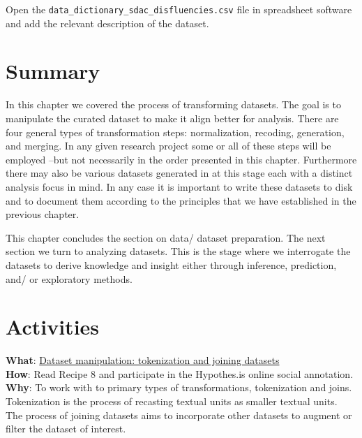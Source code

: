 \documentclass[
  letterpaper,
]{latex/krantz}
\begin{document}
Open the \texttt{data\_dictionary\_sdac\_disfluencies.csv} file in
spreadsheet software and add the relevant description of the dataset.

\hypertarget{summary-10}{%
\section*{Summary}\label{summary-10}}


In this chapter we covered the process of transforming datasets. The
goal is to manipulate the curated dataset to make it align better for
analysis. There are four general types of transformation steps:
normalization, recoding, generation, and merging. In any given research
project some or all of these steps will be employed --but not
necessarily in the order presented in this chapter. Furthermore there
may also be various datasets generated in at this stage each with a
distinct analysis focus in mind. In any case it is important to write
these datasets to disk and to document them according to the principles
that we have established in the previous chapter.

This chapter concludes the section on data/ dataset preparation. The
next section we turn to analyzing datasets. This is the stage where we
interrogate the datasets to derive knowledge and insight either through
inference, prediction, and/ or exploratory methods.

\hypertarget{activities-6}{%
\section*{Activities}\label{activities-6}}


\begin{tcolorbox}[enhanced jigsaw, toprule=.15mm, bottomtitle=1mm, coltitle=black, title=\textcolor{quarto-callout-tip-color}{\faLightbulb}\hspace{0.5em}{Recipe}, left=2mm, colframe=quarto-callout-tip-color-frame, bottomrule=.15mm, colbacktitle=quarto-callout-tip-color!10!white, leftrule=.75mm, colback=white, titlerule=0mm, breakable, toptitle=1mm, opacityback=0, arc=.35mm, rightrule=.15mm, opacitybacktitle=0.6]

\textbf{What}:
\href{https://lin380.github.io/tadr/articles/recipe_8.html}{Dataset
manipulation: tokenization and joining datasets}\\
\textbf{How}: Read Recipe 8 and participate in the Hypothes.is online
social annotation.\\
\textbf{Why}: To work with to primary types of transformations,
tokenization and joins. Tokenization is the process of recasting textual
units as smaller textual units. The process of joining datasets aims to
incorporate other datasets to augment or filter the dataset of interest.

\end{tcolorbox}
\end{document}
